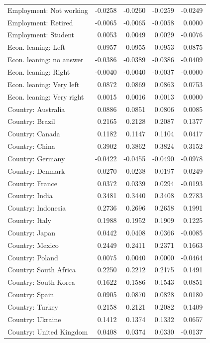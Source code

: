 \begin{tabular}{lrrrr}
Employment: Not working & -0.0258 & -0.0260 & -0.0259 & -0.0249 \\
Employment: Retired & -0.0065 & -0.0065 & -0.0058 & 0.0000 \\
Employment: Student & 0.0053 & 0.0049 & 0.0029 & -0.0076 \\
Econ. leaning: Left & 0.0957 & 0.0955 & 0.0953 & 0.0875 \\
Econ. leaning: no answer & -0.0386 & -0.0389 & -0.0386 & -0.0409 \\
Econ. leaning: Right & -0.0040 & -0.0040 & -0.0037 & -0.0000 \\
Econ. leaning: Very left & 0.0872 & 0.0869 & 0.0863 & 0.0753 \\
Econ. leaning: Very right & 0.0015 & 0.0016 & 0.0013 & 0.0000 \\
Country: Australia & 0.0886 & 0.0851 & 0.0806 & 0.0085 \\
Country: Brazil & 0.2165 & 0.2128 & 0.2087 & 0.1377 \\
Country: Canada & 0.1182 & 0.1147 & 0.1104 & 0.0417 \\
Country: China & 0.3902 & 0.3862 & 0.3824 & 0.3152 \\
Country: Germany & -0.0422 & -0.0455 & -0.0490 & -0.0978 \\
Country: Denmark & 0.0270 & 0.0238 & 0.0197 & -0.0249 \\
Country: France & 0.0372 & 0.0339 & 0.0294 & -0.0193 \\
Country: India & 0.3481 & 0.3440 & 0.3408 & 0.2783 \\
Country: Indonesia & 0.2736 & 0.2696 & 0.2658 & 0.1991 \\
Country: Italy & 0.1988 & 0.1952 & 0.1909 & 0.1225 \\
Country: Japan & 0.0442 & 0.0408 & 0.0366 & -0.0085 \\
Country: Mexico & 0.2449 & 0.2411 & 0.2371 & 0.1663 \\
Country: Poland & 0.0075 & 0.0040 & 0.0000 & -0.0464 \\
Country: South Africa & 0.2250 & 0.2212 & 0.2175 & 0.1491 \\
Country: South Korea & 0.1622 & 0.1586 & 0.1543 & 0.0851 \\
Country: Spain & 0.0905 & 0.0870 & 0.0828 & 0.0180 \\
Country: Turkey & 0.2158 & 0.2121 & 0.2082 & 0.1409 \\
Country: Ukraine & 0.1412 & 0.1374 & 0.1332 & 0.0657 \\
Country: United Kingdom & 0.0408 & 0.0374 & 0.0330 & -0.0137 \\
\bottomrule
\end{tabular}
